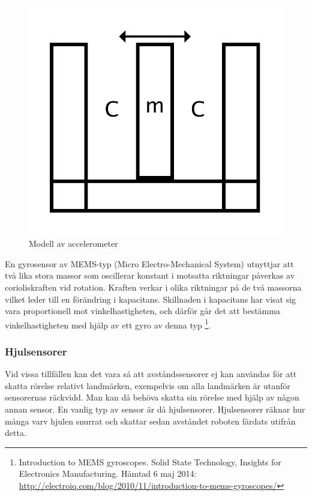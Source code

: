 \documentclass[a4paper,12pt,fleqn]{article}
\begin{document}
\begin{figure}[htp] %
  \begin{center}
  \includegraphics[keepaspectratio=true,scale=0.5]{accelerometer.png}  %
  \end{center}
  \caption{Modell av accelerometer} %
  \label{fig:accelerometer}
\end{figure}

En gyrosensor av MEMS-typ (Micro Electro-Mechanical System) utnyttjar att två lika stora massor som oscillerar konstant i motsatta riktningar påverkas av corioliskraften vid rotation. Kraften verkar i olika riktningar på de två massorna vilket leder till en förändring i kapacitans.
Skillnaden i kapacitans har visat sig vara proportionell mot vinkelhastigheten, och därför går det att bestämma vinkelhastigheten med hjälp av ett gyro av denna typ \footnote{Introduction to MEMS gyroscopes. Solid State Technology, Insights for Electronics  Manufacturing. Hämtad 6 maj 2014: \url{http://electroiq.com/blog/2010/11/introduction-to-mems-gyroscopes/}}. 

\subsubsection{Hjulsensorer}

Vid vissa tillfällen kan det vara så att avståndssensorer ej kan användas för att skatta rörelse relativt landmärken, exempelvis om alla landmärken är utanför sensorernas räckvidd. Man kan då behöva skatta sin rörelse med hjälp av någon annan sensor. En vanlig typ av sensor är då hjulsensorer. Hjulsensorer räknar hur många varv hjulen snurrat och skattar sedan avståndet roboten färdats utifrån detta. 
\end{document}
